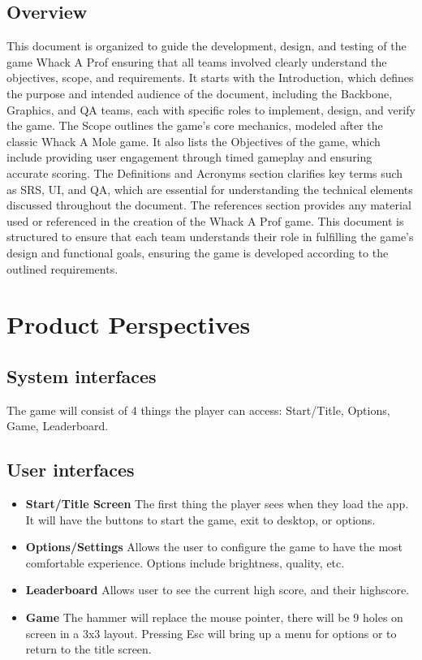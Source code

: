 \documentclass{article}
\begin{document}
\subsection{Overview}
This document is organized to guide the development, design, and testing of the game Whack A Prof ensuring that all teams involved clearly understand the objectives, scope, and requirements. It starts with the Introduction, which defines the purpose and intended audience of the document, including the Backbone, Graphics, and QA teams, each with specific roles to implement, design, and verify the game. The Scope outlines the game’s core mechanics, modeled after the classic Whack A Mole game. It also lists the Objectives of the game, which include providing user engagement through timed gameplay and ensuring accurate scoring. The Definitions and Acronyms section clarifies key terms such as SRS, UI, and QA, which are essential for understanding the technical elements discussed throughout the document. The references section provides any material used or referenced in the creation of the Whack A Prof game. This document is structured to ensure that each team understands their role in fulfilling the game’s design and functional goals, ensuring the game is developed according to the outlined requirements.

\newpage
\section{Product Perspectives}
\subsection{System interfaces}
The game will consist of 4 things the player can access: Start/Title, Options, Game, Leaderboard.

\subsection{User interfaces}
\begin{itemize}
\item \textbf{Start/Title Screen} The first thing the player sees when they load the app. It will have the buttons to start the game, exit to desktop, or options.

\item \textbf{Options/Settings} Allows the user to configure the game to have the most comfortable experience. Options include brightness, quality, etc.

\item \textbf{Leaderboard} Allows user to see the current high score, and their highscore. 

\item \textbf{Game} The hammer will replace the mouse pointer, there will be 9 holes on screen in a 3x3 layout. Pressing Esc will bring up a menu for options or to return to the title screen.

\end{itemize}
\end{document}
